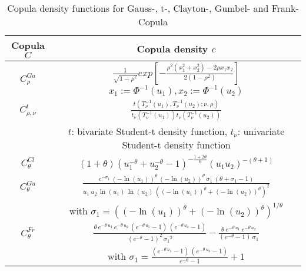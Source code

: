 \documentclass[a4paper]{article}
\begin{document}
\begin{table}[h]
	\renewcommand{\arraystretch}{2.5}
	\begin{tabular}{|c|c|} \hline
		{\bf Copula $C$}  & {\bf Copula density $c$}  \\  \hline \hline		 
		$C_\rho^{Ga}$ & $ \displaystyle \frac{1}{\sqrt{1-\rho^2}} exp\left[-\frac{\rho^2(x_1^2+x_2^2)-2\rho x_1x_2}{2(1-\rho^2)}\right]$ \hspace{0.5cm} $x_1:=\Phi^{-1}(u_1), x_2:=\Phi^{-1}(u_2)$  \\ \hline
		$C_{\rho,\nu}^t$ & $ \displaystyle \frac{t\left(T_\nu^{-1}(u_1), T_\nu^{-1}(u_2); \nu, \rho\right)}{t_\nu\left(T_\nu^{-1}(u_1)\right)t_\nu\left(T_\nu^{-1}(u_2)\right)}$ \\
		&  $t$: bivariate Student-t density function, $t_\nu$: univariate Student-t density function  \\ \hline
		$C_\theta^{Cl}$ & $\displaystyle (1+\theta)(u_1^{-\theta}+u_2^{-\theta}-1)^{-\frac{1+2\theta}{\theta}}(u_1u_2)^{-(\theta+1)}$ \\ \hline
		$C_\theta^{Gu}$ & $\displaystyle

			\frac{e^{-\sigma_1 } \,{{\left(-\ln\left(u_1 \right)\right)}}^{\theta } \,{{\left(-\ln\left(u_2 \right)\right)}}^{\theta } \,\sigma_1 \,{\left(\theta +\sigma_1 -1\right)}}{u_1 \,u_2 \,\ln\left(u_1 \right)\,\ln\left(u_2 \right)\,{{\left({{\left(-\ln\left(u_1 \right)\right)}}^{\theta } +{{\left(-\ln\left(u_2 \right)\right)}}^{\theta } \right)}}^2 }$ \\			
			& with $\sigma_1={{\left({{\left(-\ln\left(u_1 \right)\right)}}^{\theta} +{{\left(-\ln\left(u_2 \right)\right)}}^{\theta } \right)}}^{1/\theta }$  \\ \hline
			
		$C_\theta^{Fr}$ & $\displaystyle
			

	\frac{\theta \,{e}^{-\theta \,u_1 } \,{e}^{-\theta \,u_2 } \,{\left({e}^{-\theta \,u_1 } -1\right)}\,{\left({e}^{-\theta \,u_2 } -1\right)}}{{{\left({e}^{-\theta } -1\right)}}^2 \,{\sigma_1 }^2 }-\frac{\theta \,{e}^{-\theta \,u_1 } \,{e}^{-\theta\,u_2 } }{{\left({e}^{-\theta } -1\right)}\,\sigma_1 }$ \\

    & with $
\sigma_1 =\frac{{\left({e}^{-\theta \,u_1 } -1\right)}\,{\left({e}^{-\theta \,u_2 } -1\right)}}{{e}^{-\theta } -1}+1$ \\ \hline
		
	\end{tabular}
	\centering
	\caption{\small Copula density functions for Gauss-, t-, Clayton-, Gumbel- and Frank-Copula}
	\label{tb:copulaDensities}
\end{table} 
\end{document}
